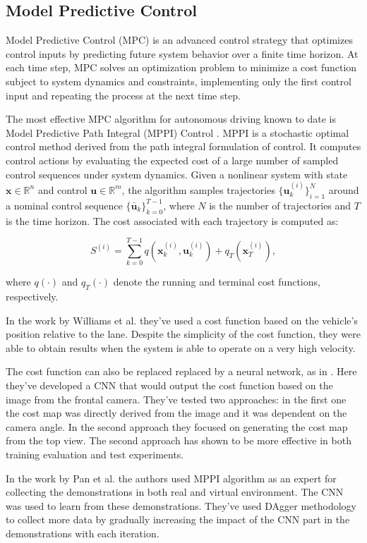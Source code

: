 \subsection{Model Predictive Control}

Model Predictive Control (MPC) is an advanced control strategy that optimizes control inputs by predicting future system behavior over a finite time horizon. At each time step, MPC solves an optimization problem to minimize a cost function subject to system dynamics and constraints, implementing only the first control input and repeating the process at the next time step.

The most effective MPC algorithm for autonomous driving known to date is Model Predictive Path Integral (MPPI) Control \autocite{williams2017model} \autocite{kappen2005linear}. MPPI is a stochastic optimal control method derived from the path integral formulation of control. It computes control actions by evaluating the expected cost of a large number of sampled control sequences under system dynamics. Given a nonlinear system with state \(\mathbf{x} \in \mathbb{R}^n\) and control \(\mathbf{u} \in \mathbb{R}^m\), the algorithm samples trajectories \(\{\mathbf{u}_k^{(i)}\}_{i=1}^N\) around a nominal control sequence \(\{\bar{\mathbf{u}}_k\}_{k=0}^{T-1}\), where \(N\) is the number of trajectories and \(T\) is the time horizon. The cost associated with each trajectory is computed as:

\[
  S^{(i)} = \sum_{k=0}^{T-1} q(\mathbf{x}_k^{(i)}, \mathbf{u}_k^{(i)}) + q_T(\mathbf{x}_T^{(i)}),
\]

where \(q(\cdot)\) and \(q_T(\cdot)\) denote the running and terminal cost functions, respectively.

In the work by Williams et al. \autocite{williams2016aggressive} they've used a cost function based on the vehicle's position relative to the lane. Despite the simplicity of the cost function, they were able to obtain results when the system is able to operate on a very high velocity.

The cost function can also be replaced replaced by a neural network, as in \autocite{drews2017aggressivedeepdrivingmodel}. Here they've developed a CNN that would output the cost function based on the image from the frontal camera. They've tested two approaches: in the first one the cost map was directly derived from the image and it was dependent on the camera angle. In the second approach they focused on generating the cost map from the top view. The second approach has shown to be more effective in both training evaluation and test experiments.

In the work by Pan et al. \autocite{pan2019agileautonomousdrivingusing} the authors used MPPI algorithm as an expert for collecting the demonstrations in both real and virtual environment. The CNN was used to learn from these demonstrations. They've used DAgger methodology \autocite{ross2011reduction} to collect more data by gradually increasing the impact of the CNN part in the demonstrations with each iteration.
